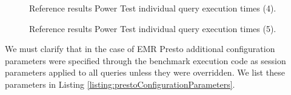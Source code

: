 \begin{figure}
   \begin{center}
   \end{center}
   \caption{Reference results Power Test individual query execution times (4).}
   \label{fig:referenceResultsPowerTestIndTimes4}
\end{figure}

\begin{figure}
   \begin{center}
   \end{center}
   \caption{Reference results Power Test individual query execution times (5).}
   \label{fig:referenceResultsPowerTestIndTimes5}
\end{figure}

We must clarify that in the case of EMR Presto additional configuration parameters were specified through the benchmark execution code as session parameters applied to all queries unless they were overridden. We list these parameters in Listing \ref{listing:prestoConfigurationParameters}.

